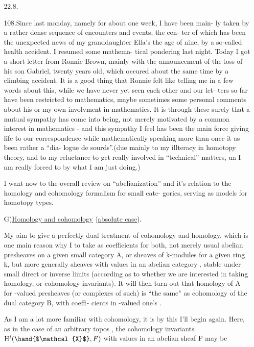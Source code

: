 
22.8.

108.\quad Since last monday,  namely for about one week,  I have been main-%
ly taken by a rather dense sequence of encounters and events,  the cen-%
ter of which has been the unexpected news of my granddaughter Ella's
the age of nine,  by a so-called health accident.  I resumed some mathema-%
tical pondering last night.  Today I got a short letter from Ronnie
Brown,  mainly with the announcement of the loss of his son Gabriel,
twenty years old,  which occured about the same time by a climbing
accident.  It is a good thing that Ronnie felt like telling me in a few
words about this,  while we have never yet seen each other and our let-%
ters so far\xout{,} have been restricted to mathematics,   maybe sometimes
some personal comments about his or my own involvment in mathematics.
It is through these surely that a mutual sympathy has come into being,
not merely motivated by a common interest in mathematics  -  and this
sympathy I feel has been the main force giving life to our correspondence\hand{\unsure{,}}
while mathematically speaking more than once it as been rather a ``dia-%
logue de sourds''.(due mainly to my illteracy in homotopy theory,  and to
my reluctance to get really involved in ``technical'' matters,  un I am
really forced to by what I am just doing.)

I want now to  the overall review on ``abelianization'' and
it's relation to the homology and cohomology formalism for small cate-%
gories,  serving as models for homotopy types.

G)\quad \uline{Homology and cohomology} (\uline{absolute case}).

My aim to give a perfectly dual treatment of cohomology and homology,
which is one main reason why I  to take as coefficients for both,
not merely usual abelian presheaves on a given small category A,  or
sheaves of k-modules for a given ring k,  but more generally sheaves
with values in an abelian category ,   stable
under small direct or inverse limits (according as to whether we are
interested in taking homology,  or cohomology invariants).  It will then
turn out that homology of A for -valued presheaves (or complexes of
such) is ``the same'' as cohomology of the dual category B, with coeffi-%
cients in -valued  one's .

As I am a lot more familiar with cohomology,  it is by this I'll
begin again.  Here,  as in the case of an arbitrary topos ,  the
cohomology invariants  $\mathrm{H}^{i}(\hand{$\mathcal{X}$},F)$  with values in an abelian sheaf F may be


